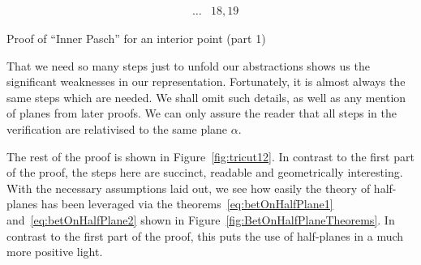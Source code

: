 \begin{boxedfigure}
\begin{align*}
&\ldots & 18,19
\end{align*}
\caption{Proof of ``Inner Pasch'' for an interior point (part 1)}
\label{fig:tricut11}
\end{boxedfigure}

That we need so many steps just to unfold our abstractions shows us the significant weaknesses in our representation. Fortunately, it is almost always the same steps which are needed. We shall omit such details, as well as any mention of planes from later proofs. We can only assure the reader that all steps in the verification are relativised to the same plane $\alpha$.

The rest of the proof is shown in Figure~\ref{fig:tricut12}. In contrast to the first part of the proof, the steps here are succinct, readable and geometrically interesting. With the necessary assumptions laid out, we see how easily the theory of half-planes has been leveraged via the theorems~\ref{eq:betOnHalfPlane1} and~\ref{eq:betOnHalfPlane2} shown in Figure~\ref{fig:BetOnHalfPlaneTheorems}. In contrast to the first part of the proof, this puts the use of half-planes in a much more positive light. 

